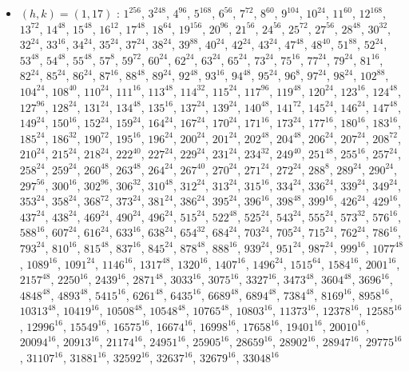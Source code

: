 \begin{itemize}
\item $(h,k)=(1,17)$ : $1^{256}$, $3^{248}$, $4^{96}$, $5^{168}$, $6^{56}$, $7^{72}$, $8^{60}$, $9^{104}$, $10^{24}$, $11^{60}$, $12^{168}$, $13^{72}$, $14^{48}$, $15^{48}$, $16^{12}$, $17^{48}$, $18^{64}$, $19^{156}$, $20^{96}$, $21^{56}$, $24^{56}$, $25^{72}$, $27^{56}$, $28^{48}$, $30^{32}$, $32^{24}$, $33^{16}$, $34^{24}$, $35^{24}$, $37^{24}$, $38^{24}$, $39^{88}$, $40^{24}$, $42^{24}$, $43^{24}$, $47^{48}$, $48^{40}$, $51^{88}$, $52^{24}$, $53^{48}$, $54^{48}$, $55^{48}$, $57^{8}$, $59^{72}$, $60^{24}$, $62^{24}$, $63^{24}$, $65^{24}$, $73^{24}$, $75^{16}$, $77^{24}$, $79^{24}$, $81^{16}$, $82^{24}$, $85^{24}$, $86^{24}$, $87^{16}$, $88^{48}$, $89^{24}$, $92^{48}$, $93^{16}$, $94^{48}$, $95^{24}$, $96^{8}$, $97^{24}$, $98^{24}$, $102^{88}$, $104^{24}$, $108^{40}$, $110^{24}$, $111^{16}$, $113^{48}$, $114^{32}$, $115^{24}$, $117^{96}$, $119^{48}$, $120^{24}$, $123^{16}$, $124^{48}$, $127^{96}$, $128^{24}$, $131^{24}$, $134^{48}$, $135^{16}$, $137^{24}$, $139^{24}$, $140^{48}$, $141^{72}$, $145^{24}$, $146^{24}$, $147^{48}$, $149^{24}$, $150^{16}$, $152^{24}$, $159^{24}$, $164^{24}$, $167^{24}$, $170^{24}$, $171^{16}$, $173^{24}$, $177^{16}$, $180^{16}$, $183^{16}$, $185^{24}$, $186^{32}$, $190^{72}$, $195^{16}$, $196^{24}$, $200^{24}$, $201^{24}$, $202^{48}$, $204^{48}$, $206^{24}$, $207^{24}$, $208^{72}$, $210^{24}$, $215^{24}$, $218^{24}$, $222^{40}$, $227^{24}$, $229^{24}$, $231^{24}$, $234^{32}$, $249^{40}$, $251^{48}$, $255^{16}$, $257^{24}$, $258^{24}$, $259^{24}$, $260^{48}$, $263^{48}$, $264^{24}$, $267^{40}$, $270^{24}$, $271^{24}$, $272^{24}$, $288^{8}$, $289^{24}$, $290^{24}$, $297^{56}$, $300^{16}$, $302^{96}$, $306^{32}$, $310^{48}$, $312^{24}$, $313^{24}$, $315^{16}$, $334^{24}$, $336^{24}$, $339^{24}$, $349^{24}$, $353^{24}$, $358^{24}$, $368^{72}$, $373^{24}$, $381^{24}$, $386^{24}$, $395^{24}$, $396^{16}$, $398^{48}$, $399^{16}$, $426^{24}$, $429^{16}$, $437^{24}$, $438^{24}$, $469^{24}$, $490^{24}$, $496^{24}$, $515^{24}$, $522^{48}$, $525^{24}$, $543^{24}$, $555^{24}$, $573^{32}$, $576^{16}$, $588^{16}$, $607^{24}$, $616^{24}$, $633^{16}$, $638^{24}$, $654^{32}$, $684^{24}$, $703^{24}$, $705^{24}$, $715^{24}$, $762^{24}$, $786^{16}$, $793^{24}$, $810^{16}$, $815^{48}$, $837^{16}$, $845^{24}$, $878^{48}$, $888^{16}$, $939^{24}$, $951^{24}$, $987^{24}$, $999^{16}$, $1077^{48}$, $1089^{16}$, $1091^{24}$, $1146^{16}$, $1317^{48}$, $1320^{16}$, $1407^{16}$, $1496^{24}$, $1515^{64}$, $1584^{16}$, $2001^{16}$, $2157^{48}$, $2250^{16}$, $2439^{16}$, $2871^{48}$, $3033^{16}$, $3075^{16}$, $3327^{16}$, $3473^{48}$, $3604^{48}$, $3696^{16}$, $4848^{48}$, $4893^{48}$, $5415^{16}$, $6261^{48}$, $6435^{16}$, $6689^{48}$, $6894^{48}$, $7384^{48}$, $8169^{16}$, $8958^{16}$, $10313^{48}$, $10419^{16}$, $10508^{48}$, $10548^{48}$, $10765^{48}$, $10803^{16}$, $11373^{16}$, $12378^{16}$, $12585^{16}$, $12996^{16}$, $15549^{16}$, $16575^{16}$, $16674^{16}$, $16998^{16}$, $17658^{16}$, $19401^{16}$, $20010^{16}$, $20094^{16}$, $20913^{16}$, $21174^{16}$, $24951^{16}$, $25905^{16}$, $28659^{16}$, $28902^{16}$, $28947^{16}$, $29775^{16}$, $31107^{16}$, $31881^{16}$, $32592^{16}$, $32637^{16}$, $32679^{16}$, $33048^{16}$

\end{itemize}

